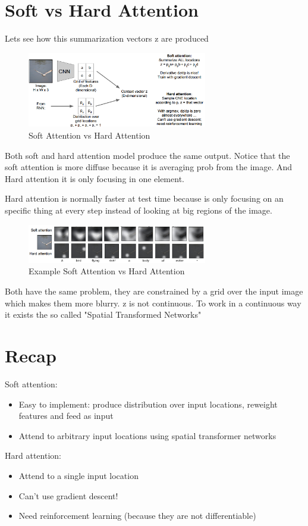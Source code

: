 \section*{Soft vs Hard Attention}
Lets see how this summarization vectors z are produced
\begin{figure}[h]
  \centering
  \includegraphics[width=0.7\textwidth]{Images/attention_models/2.png}
  \caption{Soft Attention vs Hard Attention}
\end{figure}

Both soft and hard attention model produce the same output. Notice that the soft attention is more diffuse because it is averaging prob from the image. And Hard attention it is only focusing in one element.

Hard attention is normally faster at test time because is only focusing on an specific thing at every step instead of looking at big regions of the image.

\begin{figure}[h]
  \centering
  \includegraphics[width=0.7\textwidth]{Images/attention_models/3.png}
  \caption{Example Soft Attention vs Hard Attention}
\end{figure}

Both have the same problem, they are constrained by a grid  over the input image which makes them more blurry. z is not continuous. To work in a continuous way it exists the so called "Spatial Transformed Networks"


\section*{Recap}
Soft attention:
\begin{itemize}
\item Easy to implement: produce distribution over input locations, reweight features and feed as input
\item Attend to arbitrary input locations using spatial transformer networks
\end{itemize}

Hard attention:
\begin{itemize}
\item Attend to a single input location
\item Can’t use gradient descent!
\item Need reinforcement learning (because they are not differentiable)
\end{itemize}